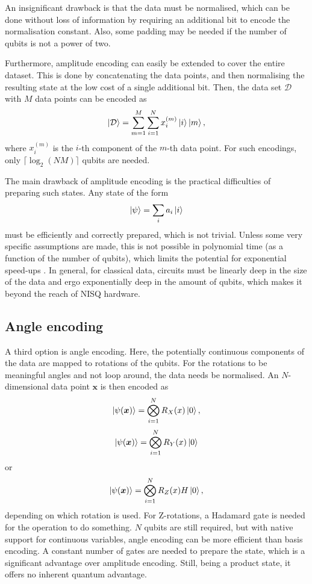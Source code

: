 An insignificant drawback is that the data must be normalised, which can be done without loss of information by requiring an additional bit to encode the normalisation constant. Also, some padding may be needed if the number of qubits is not a power of two.

Furthermore, amplitude encoding can easily be extended to cover the entire dataset. This is done by concatenating the data points, and then normalising the resulting state at the low cost of a single additional bit. Then, the data set $\mathcal{D}$ with $M$ data points can be encoded as
\begin{equation}
    \ket{\mathcal{D}} = \sum_{m=1}^M \sum_{i=1}^{N} x_i^{(m)} \ket{i} \ket{m},
\end{equation}
where $x_i^{(m)}$ is the $i$-th component of the $m$-th data point. For such encodings, only $\lceil \log_2 (N M) \rceil$ qubits are needed.

The main drawback of amplitude encoding is the practical difficulties of preparing such states. Any state of the form
\begin{equation}
    \ket{\psi} = \sum_{i} a_i \ket{i}
\end{equation}
must be efficiently and correctly prepared, which is not trivial. Unless some very specific assumptions are made, this is not possible in polynomial time (as a function of the number of qubits), which limits the potential for exponential speed-ups \cite{textbook}. In general, for classical data, circuits must be linearly deep in the size of the data and ergo exponentially deep in the amount of qubits, which makes it beyond the reach of NISQ hardware.

\subsection{Angle encoding}
A third option is angle encoding. Here, the potentially continuous components of the data are mapped to rotations of the qubits. For the rotations to be meaningful angles and not loop around, the data needs be normalised. An $N$-dimensional data point $\bm{x}$ is then encoded as
\begin{equation}
    \ket{\psi(\bm{x})} = \bigotimes_{i=1}^{N} R_X(x) \ket{0},
\end{equation}
\begin{equation}
    \ket{\psi(\bm{x})} = \bigotimes_{i=1}^{N} R_Y(x) \ket{0}
\end{equation}
or
\begin{equation}
    \ket{\psi(\bm{x})} = \bigotimes_{i=1}^{N} R_Z(x) H \ket{0},
\end{equation}
depending on which rotation is used. For Z-rotations, a Hadamard gate is needed for the operation to do something. $N$ qubits are still required, but with native support for continuous variables, angle encoding can be more efficient than basis encoding. A constant number of gates are needed to prepare the state, which is a significant advantage over amplitude encoding. Still, being a product state, it offers no inherent quantum advantage.


